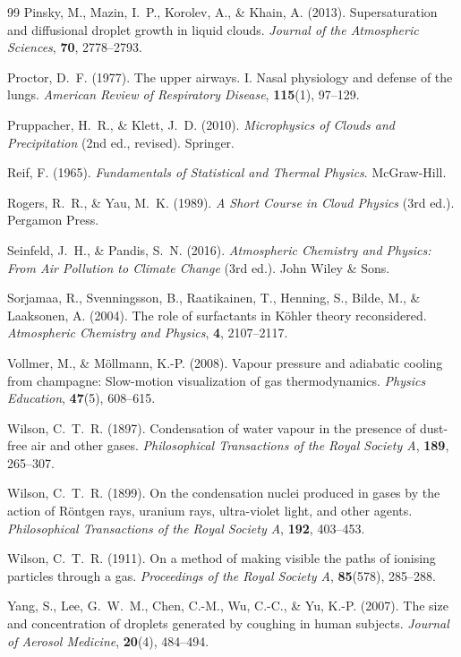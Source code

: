 \documentclass[11pt,a4paper]{article}
\theoremstyle{definition}
\theoremstyle{plain}
\begin{document}
\begin{thebibliography}{99}
Pinsky, M., Mazin, I.~P., Korolev, A., \& Khain, A. (2013).
Supersaturation and diffusional droplet growth in liquid clouds.
\textit{Journal of the Atmospheric Sciences}, \textbf{70}, 2778--2793.

Proctor, D.~F. (1977).
The upper airways. I. Nasal physiology and defense of the lungs.
\textit{American Review of Respiratory Disease}, \textbf{115}(1), 97--129.

Pruppacher, H.~R., \& Klett, J.~D. (2010).
\textit{Microphysics of Clouds and Precipitation} (2nd ed., revised).
Springer.

Reif, F. (1965).
\textit{Fundamentals of Statistical and Thermal Physics}.
McGraw-Hill.

Rogers, R.~R., \& Yau, M.~K. (1989).
\textit{A Short Course in Cloud Physics} (3rd ed.).
Pergamon Press.

Seinfeld, J.~H., \& Pandis, S.~N. (2016).
\textit{Atmospheric Chemistry and Physics: From Air Pollution to Climate Change} (3rd ed.).
John Wiley \& Sons.

Sorjamaa, R., Svenningsson, B., Raatikainen, T., Henning, S., Bilde, M., \& Laaksonen, A. (2004).
The role of surfactants in Köhler theory reconsidered.
\textit{Atmospheric Chemistry and Physics}, \textbf{4}, 2107--2117.

Vollmer, M., \& Möllmann, K.-P. (2008).
Vapour pressure and adiabatic cooling from champagne: Slow-motion visualization of gas thermodynamics.
\textit{Physics Education}, \textbf{47}(5), 608--615.

Wilson, C.~T.~R. (1897).
Condensation of water vapour in the presence of dust-free air and other gases.
\textit{Philosophical Transactions of the Royal Society A}, \textbf{189}, 265--307.

Wilson, C.~T.~R. (1899).
On the condensation nuclei produced in gases by the action of Röntgen rays, uranium rays, ultra-violet light, and other agents.
\textit{Philosophical Transactions of the Royal Society A}, \textbf{192}, 403--453.

Wilson, C.~T.~R. (1911).
On a method of making visible the paths of ionising particles through a gas.
\textit{Proceedings of the Royal Society A}, \textbf{85}(578), 285--288.

Yang, S., Lee, G.~W.~M., Chen, C.-M., Wu, C.-C., \& Yu, K.-P. (2007).
The size and concentration of droplets generated by coughing in human subjects.
\textit{Journal of Aerosol Medicine}, \textbf{20}(4), 484--494.

\end{thebibliography}
\end{document}
